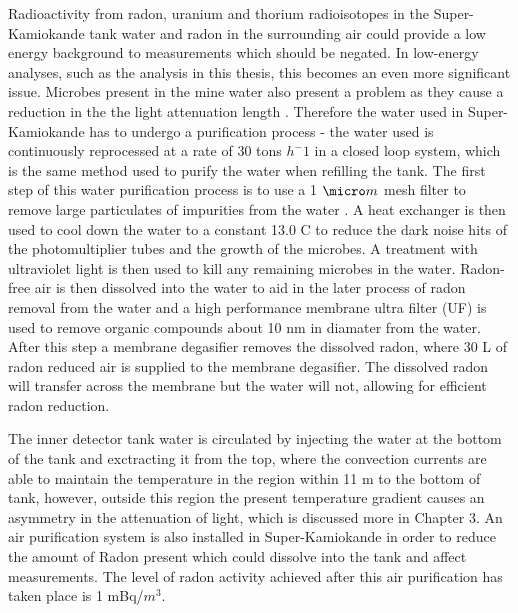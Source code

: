 Radioactivity from radon, uranium and thorium radioisotopes in the Super-Kamiokande tank water and radon in the surrounding air could provide a low energy background to measurements which should be negated. In low-energy analyses, such as the analysis in this thesis, this becomes an even more significant issue. Microbes present in the mine water also present a problem as they cause a reduction in the the light attenuation length \cite{nakano2020measurement}. Therefore the water used in Super-Kamiokande has to undergo a purification process - the water used is continuously reprocessed at a rate of 30 tons $h^-1$ in a closed loop system, which is the same method used to purify the water when refilling the tank. The first step of this water purification process is to use a 1 $\micro m$ mesh filter to remove large particulates of impurities from the water \cite{fernandez_status_2016}. A heat exchanger is then used to cool down the water to a constant 13.0 \degree C to reduce the dark noise hits of the photomultiplier tubes and the growth of the microbes. A treatment with ultraviolet light is then used to kill any remaining microbes in the water. Radon-free air is then dissolved into the water to aid in the later process of radon removal from the water and a high performance membrane ultra filter (UF) is used to remove organic compounds about 10 nm in diamater from the water. After this step a membrane degasifier removes the dissolved radon, where 30 L of radon reduced air is supplied to the membrane degasifier. The dissolved radon will transfer across the membrane but the water will not, allowing for efficient radon reduction. 
\newline 

The inner detector tank water is circulated by injecting the water at the bottom of the tank and exctracting it from the top, where the convection currents are able to maintain the temperature in the region within 11 m to the bottom of tank, however, outside this region the present temperature gradient causes an asymmetry in the attenuation of light, which is discussed more in Chapter 3. 
\newline
 An air purification system is also installed in Super-Kamiokande in order to reduce the amount of Radon present which could dissolve into the tank and affect measurements. The level of radon activity achieved after this air purification has taken place is 1 mBq/$m^{3}$.

